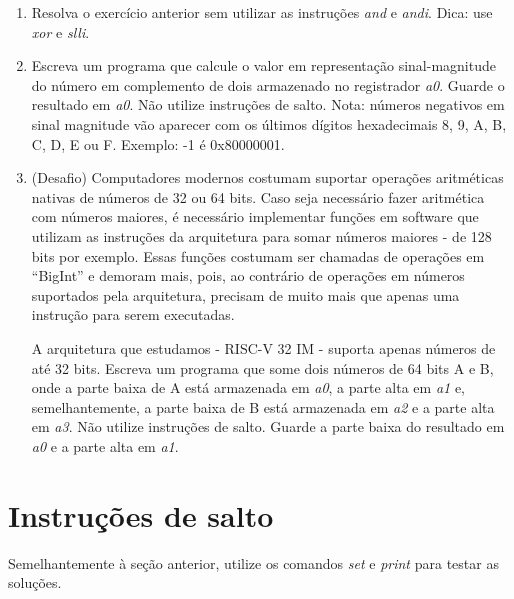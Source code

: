 \documentclass{article}
\begin{document}
\begin{enumerate}
  \item Resolva o exercício anterior sem utilizar as instruções \textit{and} e
  \textit{andi}. Dica: use \textit{xor} e \textit{slli}.

  \item Escreva um programa que calcule o valor em representação sinal-magnitude
  do número em complemento de dois armazenado no registrador \textit{a0}. Guarde
  o resultado em \textit{a0}. Não utilize instruções de salto. Nota: números
  negativos em sinal magnitude vão aparecer com os últimos dígitos hexadecimais
  8, 9, A, B, C, D, E ou F. Exemplo: -1 é 0x80000001.

  \item (Desafio) Computadores modernos costumam suportar operações aritméticas
  nativas de números de 32 ou 64 bits. Caso seja necessário fazer aritmética com
  números maiores, é necessário implementar funções em software que utilizam as
  instruções da arquitetura para somar números maiores - de 128 bits por
  exemplo. Essas funções costumam ser chamadas de operações em ``BigInt'' e
  demoram mais, pois, ao contrário de operações em números suportados pela
  arquitetura, precisam de muito mais que apenas uma instrução para serem
  executadas.

  A arquitetura que estudamos - RISC-V 32 IM - suporta apenas números de até 32
  bits. Escreva um programa que some dois números de 64 bits A e B, onde a parte
  baixa de A está armazenada em \textit{a0}, a parte alta em \textit{a1} e,
  semelhantemente, a parte baixa de B está armazenada em \textit{a2} e a parte
  alta em \textit{a3}. Não utilize instruções de salto. Guarde a parte baixa do
  resultado em \textit{a0} e a parte alta em \textit{a1}.
\end{enumerate}

\section{Instruções de salto}

Semelhantemente à seção anterior, utilize os comandos \textit{set} e
\textit{print} para testar as soluções.
\end{document}
